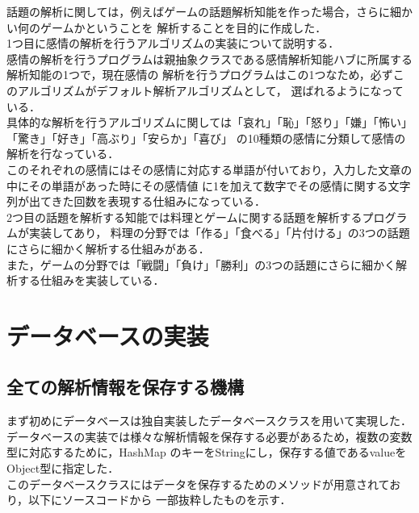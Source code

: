 話題の解析に関しては，例えばゲームの話題解析知能を作った場合，さらに細かい何のゲームかということを
解析することを目的に作成した．
\\
1つ目に感情の解析を行うアルゴリズムの実装について説明する．
\\

感情の解析を行うプログラムは親抽象クラスである感情解析知能ハブに所属する解析知能の1つで，現在感情の
解析を行うプログラムはこの1つなため，必ずこのアルゴリズムがデフォルト解析アルゴリズムとして，
選ばれるようになっている．
\\

具体的な解析を行うアルゴリズムに関しては「哀れ」「恥」「怒り」「嫌」「怖い」「驚き」「好き」「高ぶり」「安らか」「喜び」
の10種類の感情に分類して感情の解析を行なっている．
\\

このそれぞれの感情にはその感情に対応する単語が付いており，入力した文章の中にその単語があった時にその感情値
に1を加えて数字でその感情に関する文字列が出てきた回数を表現する仕組みになっている．
\\
2つ目の話題を解析する知能では料理とゲームに関する話題を解析するプログラムが実装してあり，
料理の分野では「作る」「食べる」「片付ける」の3つの話題にさらに細かく解析する仕組みがある．
\\
また，ゲームの分野では「戦闘」「負け」「勝利」の3つの話題にさらに細かく解析する仕組みを実装している．
\\


\section{データベースの実装}
\subsection{全ての解析情報を保存する機構}
まず初めにデータベースは独自実装したデータベースクラスを用いて実現した．
\\
データベースの実装では様々な解析情報を保存する必要があるため，複数の変数型に対応するために，HashMap
のキーをStringにし，保存する値であるvalueをObject型に指定した．
\\
このデータベースクラスにはデータを保存するためのメソッドが用意されており，以下にソースコードから
一部抜粋したものを示す．
\\


